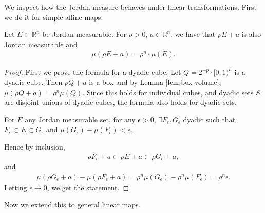 We inspect how the Jordan measure behaves under linear transformations. First we do it for simple affine maps.

\begin{prop}\label{prop:translation-dilation-invariance}
	Let $E \subset \mathbb{R}^{n}$ be Jordan measurable. For $\rho > 0$, $a \in \mathbb{R}^{n}$, we have that $\rho E + a$ is also Jordan measurable and
	\begin{align*}
		\mu (\rho E + a) = \rho^{n} \cdot \mu(E).
	\end{align*}
\end{prop}
\begin{proof}
	First we prove the formula for a dyadic cube. Let $Q = 2^{-p} \cdot [0,1)^{n}$ is a dyadic cube. Then $\rho Q + a$ is a box and by Lemma \ref{lem:box-volume}, $\mu( \rho Q + a) = \rho^{n} \mu(Q)$. Since this holds for individual cubes, and dyadic sets $S$ are disjoint unions of dyadic cubes, the formula also holds for dyadic sets.

	For $E$ any Jordan measurable set, for any $\epsilon > 0$, $\exists F_{\epsilon}, G_{\epsilon}$ dyadic such that $F_{\epsilon} \subset E \subset G_{\epsilon}$ and $\mu(G_{\epsilon}) - \mu(F_{\epsilon}) < \epsilon$.

	Hence by inclusion,
	\begin{align*}
		\rho F_{\epsilon} + a \subset \rho E + a \subset \rho G_{\epsilon} + a,
	\end{align*}
	and 
	\begin{align*}
		\mu(\rho G_{\epsilon} + a) - \mu(\rho F_{\epsilon} + a) = \rho^{n} \mu(G_{\epsilon}) - \rho^{n} \mu(F_{\epsilon}) = \rho^{n} \epsilon.
	\end{align*}
	Letting $\epsilon \to 0$, we get the statement.
\end{proof}

Now we extend this to general linear maps.


